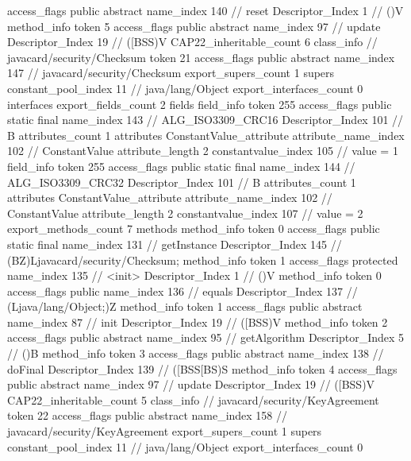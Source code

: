 {{{{{					access_flags	public abstract
					name_index	140		// reset
					Descriptor_Index	1		// ()V
				}
				method_info {
					token	5
					access_flags	public abstract
					name_index	97		// update
					Descriptor_Index	19		// ([BSS)V
				}
			}
			CAP22_inheritable_count	6
		}
		class_info {		// javacard/security/Checksum
			token	21
			access_flags	public abstract
			name_index	147		// javacard/security/Checksum
			export_supers_count	1
			supers {
				constant_pool_index	11		// java/lang/Object
			}
			export_interfaces_count	0
			interfaces {
			}
			export_fields_count	2
			fields {
			field_info {
				token	255
				access_flags	public static final
				name_index	143		// ALG_ISO3309_CRC16
				Descriptor_Index	101		// B
				attributes_count	1
				attributes {
				ConstantValue_attribute {
					attribute_name_index	102		// ConstantValue
					attribute_length	2
					constantvalue_index	105		// value = 1
				}
				}
			}
			field_info {
				token	255
				access_flags	public static final
				name_index	144		// ALG_ISO3309_CRC32
				Descriptor_Index	101		// B
				attributes_count	1
				attributes {
				ConstantValue_attribute {
					attribute_name_index	102		// ConstantValue
					attribute_length	2
					constantvalue_index	107		// value = 2
				}
				}
			}
			}
			export_methods_count	7
			methods {
				method_info {
					token	0
					access_flags	public static final
					name_index	131		// getInstance
					Descriptor_Index	145		// (BZ)Ljavacard/security/Checksum;
				}
				method_info {
					token	1
					access_flags	protected
					name_index	135		// <init>
					Descriptor_Index	1		// ()V
				}
				method_info {
					token	0
					access_flags	public
					name_index	136		// equals
					Descriptor_Index	137		// (Ljava/lang/Object;)Z
				}
				method_info {
					token	1
					access_flags	public abstract
					name_index	87		// init
					Descriptor_Index	19		// ([BSS)V
				}
				method_info {
					token	2
					access_flags	public abstract
					name_index	95		// getAlgorithm
					Descriptor_Index	5		// ()B
				}
				method_info {
					token	3
					access_flags	public abstract
					name_index	138		// doFinal
					Descriptor_Index	139		// ([BSS[BS)S
				}
				method_info {
					token	4
					access_flags	public abstract
					name_index	97		// update
					Descriptor_Index	19		// ([BSS)V
				}
			}
			CAP22_inheritable_count	5
		}
		class_info {		// javacard/security/KeyAgreement
			token	22
			access_flags	public abstract
			name_index	158		// javacard/security/KeyAgreement
			export_supers_count	1
			supers {
				constant_pool_index	11		// java/lang/Object
			}
			export_interfaces_count	0
}}}
